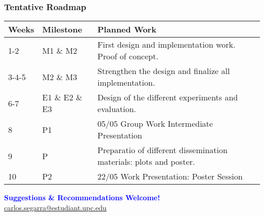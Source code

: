 \documentclass[9pt,    %
    english,            %
    xcolor=table,       %
    envcountsect,        %
    aspectratio=169     %
]{beamer}
\begin{document}
\begin{frame}
    \frametitle{Tentative Roadmap}

    \begin{table}[h!]
        \begin{tabular}{L{1.5cm}L{1.5cm}L{10cm}}
            \hline
            \textbf{Weeks} & \textbf{Milestone} & \textbf{Planned Work} \\[3pt]
            \hline {}-2 & M1 \& M2 & First design and implementation work. Proof of concept. \\[3pt]
            3-4-5 & M2 \& M3 & Strengthen the design and finalize all implementation. \\[3pt]  
            6-7 & E1 \& E2 \& E3 & Design of the different experiments and evaluation. \\[3pt] 
            8 & P1 & 05/05 Group Work Intermediate Presentation \\[3pt] 
            9 & P & Preparatio of different dissemination materials: plots and poster. \\[3pt] 
            10 & P2 & 22/05 Work Presentation: Poster Session \\[3pt] 
            \hline
        \end{tabular}
    \end{table}

    \begin{center}
        \textbf{\textcolor{blue}{Suggestions \& Recommendations Welcome!}} \\ \href{mailto:carlos.segarra@estudiant.upc.edu}{carlos.segarra@estudiant.upc.edu}
    \end{center}

\end{frame}
\end{document}
